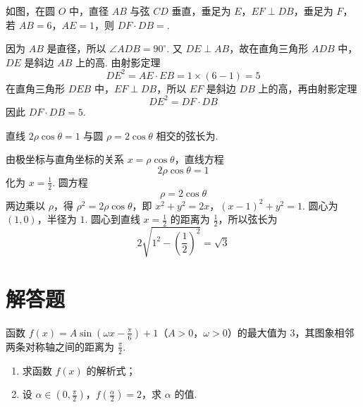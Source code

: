\reuseproblemnumber
\begin{problem}[B]
如图，在圆 \(O\) 中，直径 \(AB\) 与弦 \(CD\) 垂直，垂足为 \(E\)，\(EF \perp DB\)，垂足为 \(F\)，若 \(AB = 6\)，\(AE = 1\)，则 \(DF \cdot DB = \)\fillinblank{}.

\FloatBarrier
\end{problem}


\begin{solution}
因为 \(AB\) 是直径，所以 \(\angle ADB=90^\circ\). 又 \(DE\perp AB\)，故在直角三角形 \(ADB\) 中，\(DE\) 是斜边 \(AB\) 上的高. 由射影定理
\[
DE^2=AE\cdot EB=1\times(6-1)=5
\]
在直角三角形 \(DEB\) 中，\(EF\perp DB\)，所以 \(EF\) 是斜边 \(DB\) 上的高，再由射影定理
\[
DE^2=DF\cdot DB
\]
因此 \(DF\cdot DB=5\).
\end{solution}

\reuseproblemnumber
\begin{problem}[C]
直线 \(2\rho\cos \theta = 1\) 与圆 \(\rho = 2\cos \theta\) 相交的弦长为\fillinblank{}.
\end{problem}


\begin{solution}
由极坐标与直角坐标的关系 \(x=\rho\cos\theta\)，直线方程
\[
2\rho\cos\theta=1
\]
化为 \(x=\frac{1}{2}\). 圆方程
\[
\rho=2\cos\theta
\]
两边乘以 \(\rho\)，得 \(\rho^2=2\rho\cos\theta\)，即
\(x^2+y^2=2x\)，\((x-1)^2+y^2=1\).
圆心为 \((1,0)\)，半径为 \(1\). 圆心到直线 \(x=\frac{1}{2}\) 的距离为 \(\frac{1}{2}\)，所以弦长为
\[
2\sqrt{1^2-\left(\frac12\right)^2}=\sqrt3
\]
\end{solution}

\section{解答题}

\begin{problem}
函数 \(f(x) = A \sin \left(\omega x - \frac{\pi}{6}\right) + 1\)（\(A > 0\)，\(\omega > 0\)）的最大值为 \(3\)，其图象相邻两条对称轴之间的距离为 \(\frac{\pi}{2}\).

\begin{enumerate}
\item 求函数 \(f(x)\) 的解析式；
\item 设 \(\alpha \in \left(0, \frac{\pi}{2}\right)\)，\(f\left(\frac{\alpha}{2}\right) = 2\)，求 \(\alpha\) 的值.
\end{enumerate}
\end{problem}

